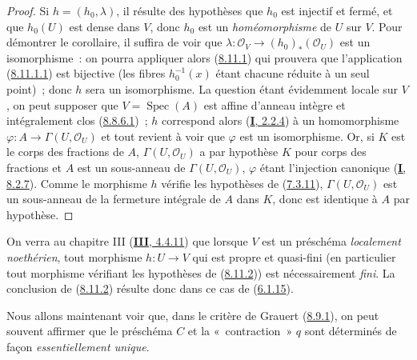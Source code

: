 \begin{proof}
Si $h=(h_0,\lambda)$, il résulte des hypothèses que $h_0$ est injectif et
fermé, et que $h_0(U)$
est dense dans $V$, donc $h_0$ est un \emph{homéomorphisme} de $U$ sur $V$.
Pour démontrer le corollaire, il suffira de voir que
$\lambda:\mathcal{O}_V\to(h_0)_*(\mathcal{O}_U)$ est un isomorphisme~: on
pourra appliquer alors (\hyperref[II.8.11.1-fr]{8.11.1}) qui prouvera que
l'application (\hyperref[II.8.11.1.1-fr]{8.11.1.1}) est bijective (les fibres
$h_0^{-1}(x)$ étant chacune réduite à un seul point)~; donc $h$ sera un
isomorphisme. La question étant évidemment locale sur $V$, on peut supposer
que $V=\operatorname{Spec}(A)$ est affine d'anneau intègre et intégralement
clos (\hyperref[II.8.8.6.1-fr]{8.8.6.1})~; $h$ correspond alors
(\hyperref[I.2.2.4-fr]{\textbf{I}, 2.2.4}) à un homomorphisme
$\varphi:A\to\Gamma(U,\mathcal{O}_U)$ et tout revient à voir que $\varphi$
est un isomorphisme. Or, si $K$ est le corps des fractions de $A$,
$\Gamma(U,\mathcal{O}_U)$ a par hypothèse $K$ pour corps des fractions et $A$
est un sous-anneau de $\Gamma(U,\mathcal{O}_U)$, $\varphi$ étant l'injection
canonique (\hyperref[I.8.2.7-fr]{\textbf{I}, 8.2.7}). Comme le morphisme $h$ vérifie
les hypothèses de (\hyperref[II.7.3.11-fr]{7.3.11}),
$\Gamma(U,\mathcal{O}_U)$ est un sous-anneau de la fermeture intégrale de $A$
dans $K$, donc est identique à $A$ par hypothèse.
\end{proof}

\begin{remark}[8.11.3]
\label{II.8.11.3-fr}
On verra au chapitre III (\hyperref[III.4.4.11-fr]{\textbf{III}, 4.4.11}) que lorsque
$V$ est un préschéma \emph{localement noethérien}, tout morphisme $h:U\to V$
qui est propre et quasi-fini (en particulier tout morphisme vérifiant les
hypothèses de (\hyperref[II.8.11.2-fr]{8.11.2})) est nécessairement
\emph{fini}. La conclusion de (\hyperref[II.8.11.2-fr]{8.11.2}) résulte donc
dans ce cas de (\hyperref[II.6.1.15-fr]{6.1.15}).
\end{remark}

\begin{env}[8.11.4]
\label{II.8.11.4-fr}
Nous allons maintenant voir que, dans le critère de Grauert
(\hyperref[II.8.9.1-fr]{8.9.1}), on peut souvent affirmer que le préschéma
$C$ et la «~contraction~» $q$ sont déterminés de façon \emph{essentiellement
unique}.
\end{env}

